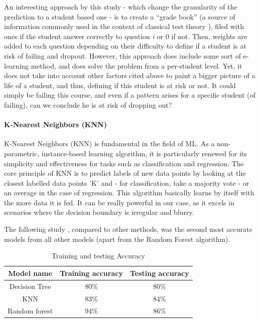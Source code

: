 \documentclass[conference]{IEEEtran}
\begin{document}
An interesting approach by this study \cite{lan_sparse_2014} - which change the granularity of the prediction to a student based one - is to create a “grade book” (a source of information commonly used in the context of classical test theory \cite{novick_axioms_1966}), filed with ones if the student answer correctly to question \textit{i} or 0 if not. Then, weights are added to each question depending on their difficulty to define if a student is at risk of failing and dropout. However, this approach does include some sort of e-learning method, and does solve the problem from a per-student level. Yet, it does not take into account other factors cited above to paint a bigger picture of a life of a student, and thus, defining if this student is at risk or not. It could simply be failing this course, and even if a pattern arises for a specific student (of failing), can we conclude he is at risk of dropping out?

\vspace{8pt}
\paragraph{K-Nearest Neighbors (KNN)}
K-Nearest Neighbors (KNN) is fundamental in the field of ML. As a non-parametric, instance-based learning algorithm, it is particularly renewed for its simplicity and effectiveness for tasks such as classification and regression.
The core principle of KNN is to predict labels of new data points by looking at the closest labelled data points 'K' and - for classification, take a majority vote - or an average in the case of regression. This algorithm basically learns by itself with the more data it is fed.
It can be really powerful in our case, as it excels in scenarios where the decision boundary is irregular and blurry.

The following study \cite{shiful_machine_2021}, compared to other methods, was the second most accurate models from all other models (apart from the Random Forest algorithm).
\begin{table}[H]
    \centering
    \caption{Training and testing Accuracy\cite{shiful_machine_2021}}
    \begin{tabular}{|c|c|c|}
        \hline
        \textbf{Model name} & \textbf{Training accuracy}  & \textbf{Testing accuracy}\\
        \hline
        Decision Tree & 80\% & 80\% \\
        \hline
        KNN & 83\% & 84\% \\
        \hline
        Random forest & 94\% & 86\% \\
        \hline
    \end{tabular}
    \label{tab:training_testing_acc_shiful}
\end{table}
\end{document}
